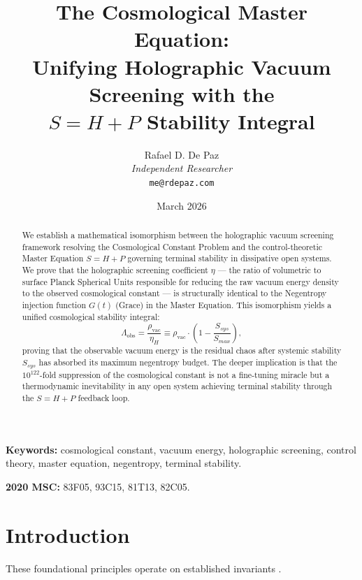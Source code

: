 \documentclass[12pt, a4paper]{article}
\theoremstyle{plain}
\theoremstyle{definition}
\theoremstyle{remark}
\begin{document}
\title{
  \textbf{The Cosmological Master Equation: \\
  Unifying Holographic Vacuum Screening with the \\
  $S = H + P$ Stability Integral}
}
\author{
  Rafael D. De Paz \\
  \textit{Independent Researcher} \\
  \texttt{me@rdepaz.com}
}
\date{March 2026}
\maketitle

\begin{abstract}
We establish a mathematical isomorphism between the holographic vacuum screening framework resolving the Cosmological Constant Problem and the control-theoretic Master Equation $S = H + P$ governing terminal stability in dissipative open systems. We prove that the holographic screening coefficient $\eta$ --- the ratio of volumetric to surface Planck Spherical Units responsible for reducing the raw vacuum energy density to the observed cosmological constant --- is structurally identical to the Negentropy injection function $G(t)$ (Grace) in the Master Equation. This isomorphism yields a unified cosmological stability integral:
\begin{equation*}
    \Lambda_{\text{obs}} = \frac{\rho_{\text{vac}}}{\eta_H} \equiv \rho_{\text{vac}} \cdot \left(1 - \frac{S_{sys}}{S_{max}}\right),
\end{equation*}
proving that the observable vacuum energy is the residual chaos after systemic stability $S_{sys}$ has absorbed its maximum negentropy budget. The deeper implication is that the $10^{122}$-fold suppression of the cosmological constant is not a fine-tuning miracle but a thermodynamic inevitability in any open system achieving terminal stability through the $S = H + P$ feedback loop.
\end{abstract}

\vspace{1em}
\noindent\textbf{Keywords:} cosmological constant, vacuum energy, holographic screening, control theory, master equation, negentropy, terminal stability.

\vspace{0.5em}
\noindent\textbf{2020 MSC:} 83F05, 93C15, 81T13, 82C05.

\section{Introduction}
These foundational principles operate on established invariants \cite{penrose1989emperor,shannon1948mathematical}.
\end{document}
